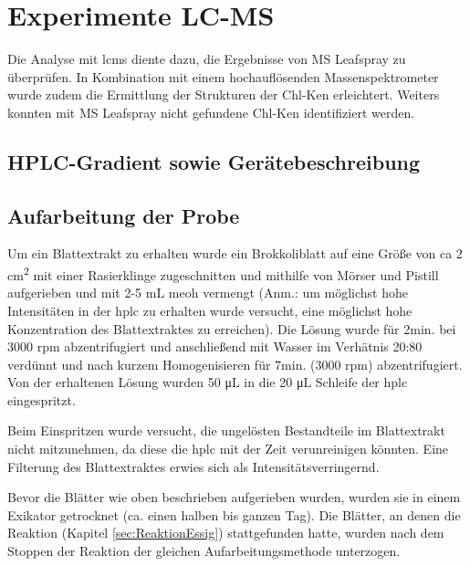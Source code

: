\chapter{Experimente LC-MS} 

Die Analyse mit \gls{lcms} diente dazu, die Ergebnisse von MS Leafspray zu überprüfen. In Kombination mit einem hochauflösenden Massenspektrometer wurde zudem die Ermittlung der Strukturen der \gls{Chl-K}en erleichtert. Weiters konnten mit MS Leafspray nicht gefundene \gls{Chl-K}en identifiziert werden. \\

\section{HPLC-Gradient sowie Gerätebeschreibung} \label{sec:HPLCAufarbeitungderProbe} 

\section{Aufarbeitung der Probe} \label{sec:HPLCAufarbeitungderProbe}

Um ein Blattextrakt zu erhalten wurde ein Brokkoliblatt auf eine Größe von \gls{ca} 2 \si{cm^{2}} mit einer Rasierklinge zugeschnitten und mithilfe von Mörser und Pistill aufgerieben und mit 2-5 mL \gls{meoh} vermengt (Anm.: um möglichst hohe Intensitäten in der \gls{hplc} zu erhalten wurde versucht, eine möglichst hohe Konzentration des Blattextraktes zu erreichen). Die Lösung wurde für 2min. bei 3000 rpm abzentrifugiert und anschließend mit Wasser im Verhätnis 20:80 verdünnt und nach kurzem Homogenisieren für 7min. (3000 rpm) abzentrifugiert. Von der erhaltenen Lösung wurden 50 \si{\uL} in die 20 \si{\uL} Schleife der \gls{hplc} eingespritzt. 


Beim Einspritzen wurde versucht, die ungelösten Bestandteile im Blattextrakt nicht mitzunehmen, da diese die \gls{hplc} mit der Zeit verunreinigen könnten. Eine Filterung des Blattextraktes erwies sich als Intensitätsverringernd.

Bevor die Blätter wie oben beschrieben aufgerieben wurden, wurden sie in einem Exikator getrocknet (ca. einen halben bis ganzen Tag). Die Blätter, an denen die Reaktion (Kapitel \ref{sec:ReaktionEssig}) stattgefunden hatte, wurden nach dem Stoppen der Reaktion der gleichen Aufarbeitungsmethode unterzogen. 

